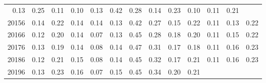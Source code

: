 \begin{table}[!h]
\begin{tabular}{lllllllllllll}
  \multicolumn{1}{|r}{0.13} &
  \multicolumn{1}{r}{0.25} &
  \multicolumn{1}{r}{0.11} &
  \multicolumn{1}{r}{0.10} &
  \multicolumn{1}{r}{0.13} &
  \multicolumn{1}{r}{0.42} &
  \multicolumn{1}{r}{0.28} &
  \multicolumn{1}{r}{0.14} &
  \multicolumn{1}{r}{0.23} &
  \multicolumn{1}{r}{0.10} &
  \multicolumn{1}{r}{0.11} &
  \multicolumn{1}{r}{0.21} \\
\multicolumn{1}{l}{\hspace{1em}20156} &
  \multicolumn{1}{|r}{0.14} &
  \multicolumn{1}{r}{0.22} &
  \multicolumn{1}{r}{0.14} &
  \multicolumn{1}{r}{0.14} &
  \multicolumn{1}{r}{0.13} &
  \multicolumn{1}{r}{0.42} &
  \multicolumn{1}{r}{0.27} &
  \multicolumn{1}{r}{0.15} &
  \multicolumn{1}{r}{0.22} &
  \multicolumn{1}{r}{0.11} &
  \multicolumn{1}{r}{0.13} &
  \multicolumn{1}{r}{0.22} \\
\multicolumn{1}{l}{\hspace{1em}20166} &
  \multicolumn{1}{|r}{0.12} &
  \multicolumn{1}{r}{0.20} &
  \multicolumn{1}{r}{0.14} &
  \multicolumn{1}{r}{0.07} &
  \multicolumn{1}{r}{0.13} &
  \multicolumn{1}{r}{0.45} &
  \multicolumn{1}{r}{0.28} &
  \multicolumn{1}{r}{0.18} &
  \multicolumn{1}{r}{0.20} &
  \multicolumn{1}{r}{0.11} &
  \multicolumn{1}{r}{0.15} &
  \multicolumn{1}{r}{0.22} \\
\multicolumn{1}{l}{\hspace{1em}20176} &
  \multicolumn{1}{|r}{0.13} &
  \multicolumn{1}{r}{0.19} &
  \multicolumn{1}{r}{0.14} &
  \multicolumn{1}{r}{0.08} &
  \multicolumn{1}{r}{0.14} &
  \multicolumn{1}{r}{0.47} &
  \multicolumn{1}{r}{0.31} &
  \multicolumn{1}{r}{0.17} &
  \multicolumn{1}{r}{0.18} &
  \multicolumn{1}{r}{0.11} &
  \multicolumn{1}{r}{0.16} &
  \multicolumn{1}{r}{0.23} \\
\multicolumn{1}{l}{\hspace{1em}20186} &
  \multicolumn{1}{|r}{0.12} &
  \multicolumn{1}{r}{0.21} &
  \multicolumn{1}{r}{0.15} &
  \multicolumn{1}{r}{0.08} &
  \multicolumn{1}{r}{0.14} &
  \multicolumn{1}{r}{0.45} &
  \multicolumn{1}{r}{0.32} &
  \multicolumn{1}{r}{0.17} &
  \multicolumn{1}{r}{0.21} &
  \multicolumn{1}{r}{0.11} &
  \multicolumn{1}{r}{0.16} &
  \multicolumn{1}{r}{0.23} \\
\multicolumn{1}{l}{\hspace{1em}20196} &
  \multicolumn{1}{|r}{0.13} &
  \multicolumn{1}{r}{0.23} &
  \multicolumn{1}{r}{0.16} &
  \multicolumn{1}{r}{0.07} &
  \multicolumn{1}{r}{0.15} &
  \multicolumn{1}{r}{0.45} &
  \multicolumn{1}{r}{0.34} &
  \multicolumn{1}{r}{0.20} &
  \multicolumn{1}{r}{0.21} &

\end{tabular}
\end{table}
